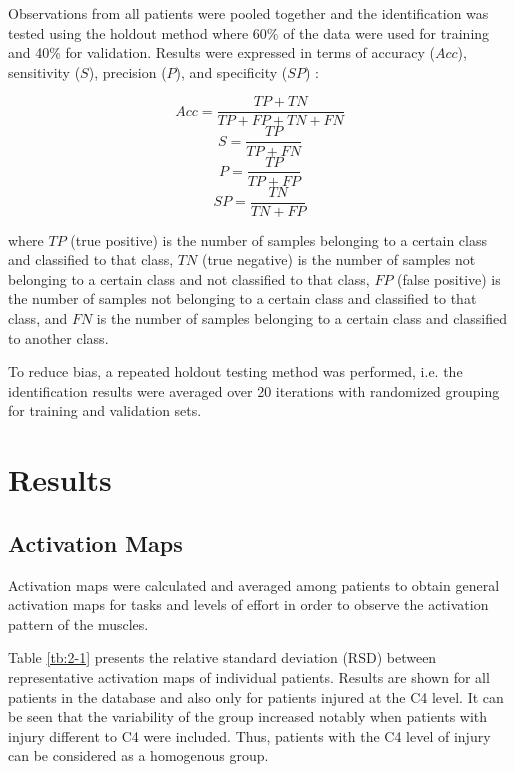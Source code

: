 Observations from all patients were pooled together and the identification was tested using the holdout method where 60\% of the data were used for training and 40\% for validation. Results were expressed in terms of accuracy ($Acc$), sensitivity ($S$), precision ($P$), and specificity ($SP$) \citep{Farina2001}:

\begin{equation} \label{eq:2-4}
Acc = \frac{TP + TN}{TP + FP + TN + FN}
\end{equation}
\begin{equation} \label{eq:2-5}
S = \frac{TP}{TP + FN}
\end{equation}
\begin{equation} \label{eq:2-6}
P = \frac{TP}{TP + FP}
\end{equation}
\begin{equation} \label{eq:2-7}
SP = \frac{TN}{TN + FP}
\end{equation}

where $TP$ (true positive) is the number of samples belonging to a certain class and classified to that class, $TN$ (true negative) is the number of samples not belonging to a certain class and not classified to that class, $FP$ (false positive) is the number of samples not belonging to a certain class and classified to that class, and $FN$ is the number of samples belonging to a certain class and classified to another class. 

To reduce bias, a repeated holdout testing method was performed, i.e. the identification results were averaged over 20 iterations with randomized grouping for training and validation sets.



\section{Results}
\subsection{Activation Maps}
Activation maps were calculated and averaged among patients to obtain general activation maps for tasks and levels of effort in order to observe the activation pattern of the muscles.

Table \ref{tb:2-1} presents the relative standard deviation (RSD) between representative activation maps of individual patients. Results are shown for all patients in the database and also only for patients injured at the C4 level. It can be seen that the variability of the group increased notably when patients with injury different to C4 were included. Thus, patients with the C4 level of injury can be considered as a homogenous group.


